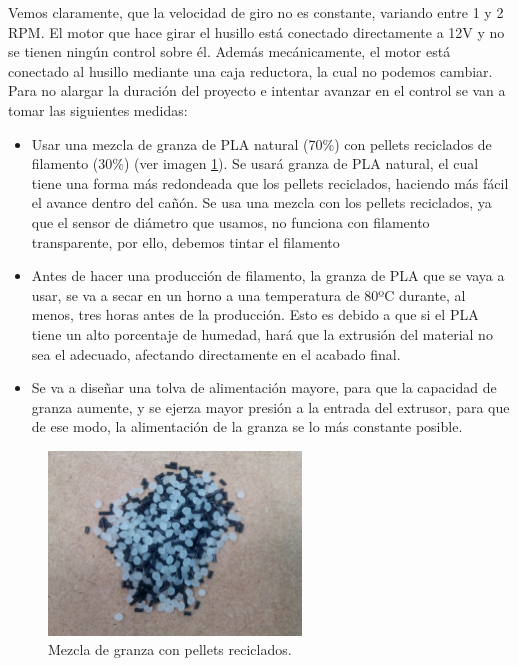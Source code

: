 Vemos claramente, que la velocidad de giro no es constante, variando entre 1 y 2 RPM. El motor que hace girar el husillo está conectado directamente a 12V y no se tienen ningún control sobre él. Además mecánicamente, el motor está conectado al husillo mediante una caja reductora, la cual no podemos cambiar. Para no alargar la duración del proyecto e intentar avanzar en el control se van a tomar las siguientes medidas:

\begin{itemize}
    \item{Usar una mezcla de granza de PLA natural (70\%) con pellets reciclados de filamento (30\%) (ver imagen \ref{fig:2007105-mezc}). Se usará granza de PLA natural, el cual tiene una forma más redondeada que los pellets reciclados, haciendo más fácil el avance dentro del cañón. Se usa una mezcla con los pellets reciclados, ya que el sensor de diámetro que usamos, no funciona con filamento transparente, por ello, debemos tintar el filamento}
    \item{Antes de hacer una producción de filamento, la granza de PLA que se vaya a usar, se va a secar en un horno a una temperatura de 80ºC durante, al menos, tres horas antes de la producción. Esto es debido a que si el PLA tiene un alto porcentaje de humedad, hará que la extrusión del material no sea el adecuado, afectando directamente en el acabado final.}
    \item{Se va a diseñar una tolva de alimentación mayore, para que la capacidad de granza aumente, y se ejerza mayor presión a la entrada del extrusor, para que de ese modo, la alimentación de la granza se lo más constante posible.}
\end{itemize}


\begin{figure}[H]
    \centering
    \includegraphics[width=0.6\textwidth]{images/producciones/20072015/mezcla.jpg}
    \caption{Mezcla de granza con pellets reciclados.}
    \label{fig:2007105-mezc}
\end{figure}

